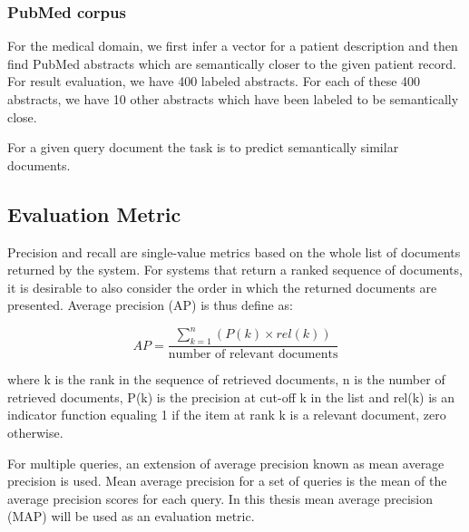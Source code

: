 \documentclass[12pt,a4paper] {article}
\begin{document}
	\subsubsection*{PubMed corpus}
	
	For the medical domain, we first infer a vector for a patient description and then find PubMed abstracts which are semantically closer to the given patient record.
	For result evaluation, we have 400 labeled abstracts. For each of these 400 abstracts, we have 10 other abstracts which have been labeled to be semantically close. 
	
	For a given query document the task is to predict semantically similar documents.
	
	
	
	\subsection*{Evaluation Metric}
	Precision and recall are single-value metrics based on the whole list of documents returned by the system. For systems that return a ranked sequence of documents, it is desirable to also consider the order in which the returned documents are presented. Average precision (AP) is thus define as:
	
	\begin{equation}
	AP =\frac {\sum_{k=1}^{n}(P(k)\times rel (k))}{\mbox {number of relevant documents}}
	\end{equation}
	
	where k is the rank in the sequence of retrieved documents,  n is the number of retrieved documents,  P(k) is the precision at cut-off k in the list and rel(k) is an indicator function equaling 1 if the item at rank k is a relevant document, zero otherwise.
	
	For multiple queries, an extension of average precision known as mean average precision is used. Mean average precision for a set of queries is the mean of the average precision scores for each query. In this thesis mean average precision (MAP) will be used as an evaluation metric.
	
	
	 
	
\end{document}
